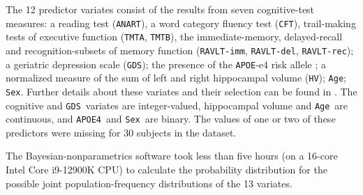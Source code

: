 \documentclass[a4paper,12pt,%
onecolumn,oneside,article,%
british%
]{memoir}
\theoremstyle{remark}
\theoremstyle{innote}
\renewcommand*{\|}[1][]{\nonscript\:#1\vert\nonscript\:\mathopen{}}
\newcommand*{\age}{\texttt{Age}}
\newcommand*{\sex}{\texttt{Sex}}
\newcommand*{\apoe}{\texttt{APOE4}}
\newcommand*{\hv}{\texttt{HV}}
\newcommand*{\anart}{\texttt{ANART}}
\newcommand*{\cft}{\texttt{CFT}}
\newcommand*{\gds}{\texttt{GDS}}
\newcommand*{\ravltimm}{\texttt{RAVLT-imm}}
\newcommand*{\ravltdel}{\texttt{RAVLT-del}}
\newcommand*{\ravltrec}{\texttt{RAVLT-rec}}
\newcommand*{\tmta}{\texttt{TMTA}}
\newcommand*{\tmtb}{\texttt{TMTB}}
\begin{document}

The 12 predictor variates consist of the results from seven cognitive-test measures: a reading test (\anart), a word category fluency test (\cft), trail-making tests of executive function (\tmta, \tmtb), the immediate-memory, delayed-recall and recognition-subsets of memory function (\ravltimm, \ravltdel, \ravltrec); a geriatric depression scale (\gds); the presence of the \texttt{APOE}-e4 risk allele \autocites{liuetal2013}; a normalized measure of the sum of left and right hippocampal volume (\hv); \age; \sex. Further details about these variates and their selection can be found in \autocites{ryeetal2022}. The cognitive and \gds\ variates are integer-valued, hippocampal volume and \age\ are continuous, and \apoe\ and \sex\ are binary. The values of one or two of these predictors were missing for 30 subjects in the dataset.


The Bayesian-nonparametrics software took less than five hours (on a 16-core Intel Core i9-12900K CPU) to calculate the probability distribution for the possible joint population-frequency distributions of the 13 variates.
\end{document}
